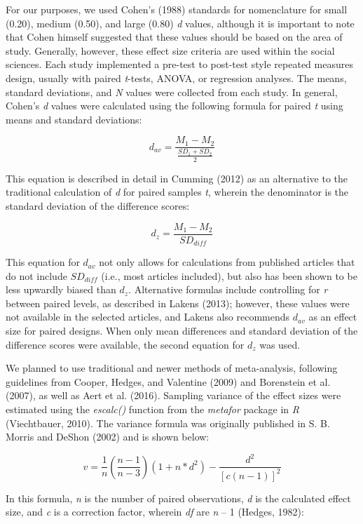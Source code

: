 \documentclass[english,man, mask]{apa6}
\theoremstyle{definition}
\theoremstyle{definition}
\theoremstyle{definition}
\theoremstyle{remark}
\begin{document}
For our purposes, we used Cohen's (1988) standards for nomenclature for
small (0.20), medium (0.50), and large (0.80) \emph{d} values, although
it is important to note that Cohen himself suggested that these values
should be based on the area of study. Generally, however, these effect
size criteria are used within the social sciences. Each study
implemented a pre-test to post-test style repeated measures design,
usually with paired \emph{t}-tests, ANOVA, or regression analyses. The
means, standard deviations, and \emph{N} values were collected from each
study. In general, Cohen's \emph{d} values were calculated using the
following formula for paired \emph{t} using means and standard
deviations:

\[
{d_{av}} = \frac { M_1 - M_2 } { \frac { SD_1 + SD_2 } { 2 }}
\]

This equation is described in detail in Cumming (2012) as an alternative
to the traditional calculation of \emph{d} for paired samples \emph{t},
wherein the denominator is the standard deviation of the difference
scores:

\[
{d_{z}} = \frac { M_1 - M_2 } { SD_{diff} }
\]

This equation for \(d_{av}\) not only allows for calculations from
published articles that do not include \(SD_{diff}\) (i.e., most
articles included), but also has been shown to be less upwardly biased
than \(d_{z}\). Alternative formulas include controlling for \emph{r}
between paired levels, as described in Lakens (2013); however, these
values were not available in the selected articles, and Lakens also
recommends \(d_{av}\) as an effect size for paired designs. When only
mean differences and standard deviation of the difference scores were
available, the second equation for \(d_z\) was used.

We planned to use traditional and newer methods of meta-analysis,
following guidelines from Cooper, Hedges, and Valentine (2009) and
Borenstein et al. (2007), as well as Aert et al. (2016). Sampling
variance of the effect sizes were estimated using the \emph{escalc()}
function from the \emph{metafor} package in \emph{R} (Viechtbauer,
2010). The variance formula was originally published in S. B. Morris and
DeShon (2002) and is shown below:

\[
v = \frac { 1 } { n } (\frac { n - 1 } { n - 3 } )(1 + n*d^2) - \frac { d^2 } { [c(n-1)]^2}
\]

In this formula, \emph{n} is the number of paired observations, \emph{d}
is the calculated effect size, and \emph{c} is a correction factor,
wherein \emph{df} are \emph{n} -- 1 (Hedges, 1982):
\end{document}
